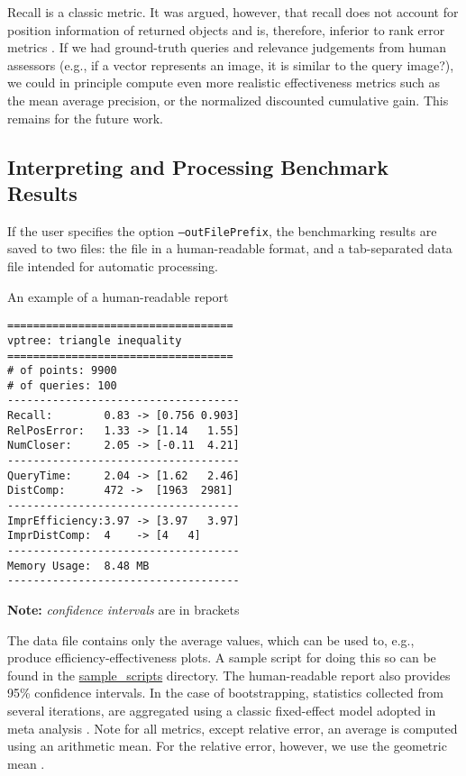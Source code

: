 \documentclass[runningheads,a4paper]{llncs}
\newcommand{\ttt}[1]{\texttt{#1}}
\begin{document}
Recall is a classic metric. 
It was argued, however, 
that recall does not account for position information of returned objects
and is, therefore, inferior to rank error metrics \cite{Amato_et_al:2003,Cayton:2008}.
If we had ground-truth queries and relevance judgements from human assessors (e.g.,
if a vector represents an image, it is similar to the query image?),
we could in principle compute even more realistic effectiveness metrics 
such as the mean average precision,
or the normalized discounted cumulative gain.
This remains for the future work.

\subsection{Interpreting and Processing Benchmark Results}
If the user specifies the option \ttt{--outFilePrefix},
the benchmarking results are saved to two files:
the file in a human-readable format,
and a tab-separated data file intended for automatic processing.

\begin{wraptable}{R}{0.52\textwidth}
\caption{An example of a human-readable report 
\label{TableHRep}}
\begin{verbatim}
===================================
vptree: triangle inequality
===================================
# of points: 9900
# of queries: 100
------------------------------------
Recall:        0.83 -> [0.756 0.903]
RelPosError:   1.33 -> [1.14   1.55]
NumCloser:     2.05 -> [-0.11  4.21]
------------------------------------
QueryTime:     2.04 -> [1.62   2.46]
DistComp:      472 ->  [1963  2981]
------------------------------------
ImprEfficiency:3.97 -> [3.97   3.97]
ImprDistComp:  4    -> [4   4]
------------------------------------
Memory Usage:  8.48 MB
------------------------------------
\end{verbatim}
\textbf{Note:} \emph{confidence intervals} are in brackets
\vspace{-4em}
\end{wraptable}

The data file contains only the average values,
which can be used to, e.g., produce efficiency-effectiveness plots.
A sample script for doing this so can be found in the \href{https://github.com/searchivarius/NonMetricSpaceLib/blob/master/sample_scripts/nips2013/figures/all.sh}{sample\_scripts} directory.
The human-readable report also provides 95\% confidence intervals.
In the case of bootstrapping, statistics collected from several iterations,
are aggregated using a classic fixed-effect model adopted in meta analysis \cite{Hedges_and_Vevea:1998}.
Note for all metrics, except relative error, an average is computed using an arithmetic mean.
For the relative error, however, we use the geometric mean  \cite{king:1986}.
\end{document}
